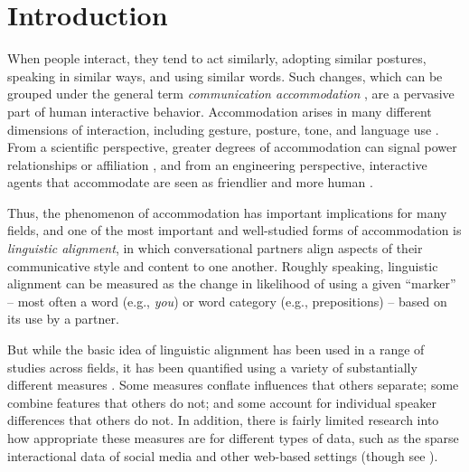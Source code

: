 \documentclass{acm_proc_article-sp}
\begin{document}



\section{Introduction}

When people interact, they tend to act similarly, adopting similar postures, speaking in similar ways, and using similar words. Such changes, which can be grouped under the general term \textit{communication accommodation} \cite{GilesCouplandCoupland1991}, are a pervasive part of human interactive behavior. Accommodation arises in many different dimensions of interaction, including gesture, posture, tone, and language use \cite{CondonOgston1967,BourhisGiles1977,GilesSchererTaylor1979,LeveltKelter1982,HaleBurgoon1984,ChartrandvanBaaren2009}. From a scientific perspective, greater degrees of accommodation can signal power relationships or affiliation \cite{WillemynsEtAl1997,Gnisci2005,DNMEtAl2012}, and from an engineering perspective, interactive agents that accommodate are seen as friendlier and more human \cite{NassLee2000}. 

Thus, the phenomenon of accommodation has important implications for many fields, and one of the most important and well-studied forms of accommodation is \textit{linguistic alignment}, in which conversational partners align aspects of their communicative style and content to one another. Roughly speaking, linguistic alignment can be measured as the change in likelihood of using a given ``marker'' -- most often a word (e.g., \textit{you}) or word category (e.g., prepositions) -- based on its use by a partner. 

But while the basic idea of linguistic alignment has been used in a range of studies across fields, it has been quantified using a variety of substantially different measures \cite{IrelandEtAl2011,DNMGamonDumais2011,FusaroliEtAl2012}. Some measures conflate influences that others separate; some combine features that others do not; and some account for individual speaker differences that others do not. In addition, there is fairly limited research into how appropriate these measures are for different types of data, such as the sparse interactional data of social media and other web-based settings (though see \cite{XuReitter2015}).  
\end{document}
